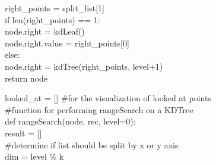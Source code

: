 \documentclass[english, fontsize=12pt, paper=a4, twoside=false, draft=true, pagesize=auto, version=last, DIV=16]{scrartcl}
\theoremstyle{break}
\begin{document}
\hspace*{10mm}right\_points = split\_list[1]\\
\hspace*{10mm}if len(right\_points) == 1:\\
\hspace*{10mm}\hspace*{10mm}node.right = kdLeaf()\\
\hspace*{10mm}\hspace*{10mm}node.right.value = right\_points[0]\\
\hspace*{10mm}else:\\
\hspace*{10mm}\hspace*{10mm}node.right = kdTree(right\_points, level+1)\\
\hspace*{10mm}return node\\

\newpage

looked\_at = [] \#for the visualization of looked at points\\
\#function for performing rangeSearch on a KDTree\\
def rangeSearch(node, rec, level=0):\\
\hspace*{10mm}result = []\\
\hspace*{10mm}\#determine if list should be split by x or y axis\\
\hspace*{10mm}dim = level \% k\\
    
\end{document}
